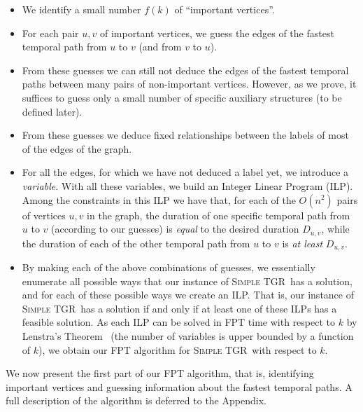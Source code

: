 \documentclass[a4paper,UKenglish,cleveref, autoref, thm-restate, anonymous]{lipics-v2021}
\newcommand{\ie}{i.\,e.,\ }
\newcommand{\deltaExact}{\textsc{Simple TGR}}
\begin{document}
\begin{itemize}
    \item We identify a small number $f(k)$ of ``important vertices''.
    \item For each pair $u,v$ of important vertices, we guess the edges of the fastest temporal path from $u$ to $v$ (and from $v$ to $u$).
    \item From these guesses we can still not deduce the edges of the fastest temporal paths between many pairs of non-important vertices. However, as we prove, it suffices to guess only a small number of specific auxiliary structures (to be defined later).
    \item From these guesses we deduce fixed relationships between the labels of most of the edges of the graph. 
    \item For all the edges, for which we have not deduced a label yet, we introduce a \emph{variable}. With all these variables, we build an Integer Linear Program (ILP). 
    Among the constraints in this ILP we have that, for each of the $O(n^2)$ pairs of vertices $u,v$ in the graph, the duration of one specific temporal path from $u$ to $v$ (according to our guesses) is \emph{equal} to the desired duration $D_{u,v}$, while the duration of each of the other temporal path from $u$ to $v$ is \emph{at least} $D_{u,v}$.
    \item 
    By making each of the above combinations of guesses, we essentially enumerate all possible ways that our instance of \deltaExact\ has a solution, and for each of these possible ways we create an ILP. That is, our instance of \deltaExact\ has a solution if and only if at least one of these ILPs has a feasible solution.
    As each ILP can be solved in FPT time with respect to $k$ by Lenstra's Theorem~\cite{Lenstra1983Integer} (the number of variables is upper bounded by a function of $k$), we obtain our FPT algorithm for \deltaExact\ with respect to $k$.
\end{itemize}


We now present the first part of our FPT algorithm, that is, identifying important vertices and guessing information about the fastest temporal paths. A full description of the algorithm is deferred to the Appendix.
\end{document}
